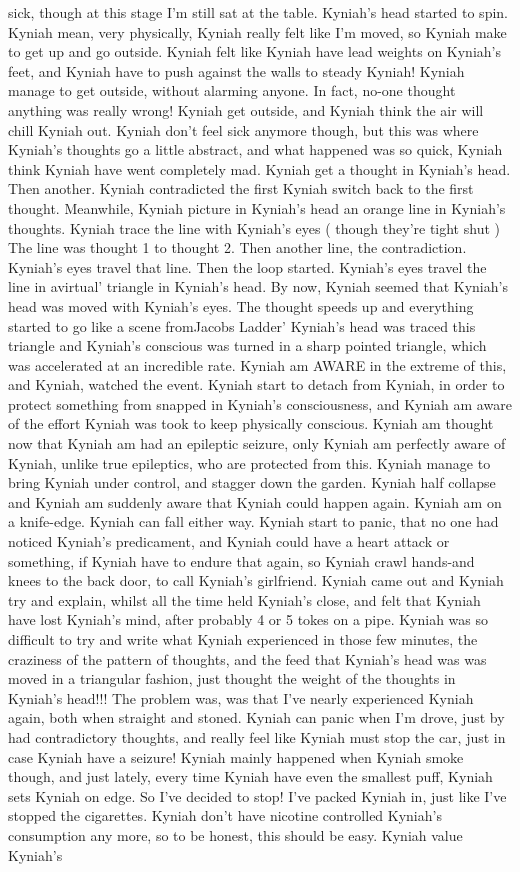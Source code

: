\documentclass[12pt]{book}
\begin{document}
sick, though at this stage I'm still sat at the table. Kyniah's head started to spin. Kyniah mean, very physically, Kyniah really felt like I'm moved, so Kyniah make to get up and go outside. Kyniah felt like Kyniah have lead weights on Kyniah's feet, and Kyniah have to push against the walls to steady Kyniah! Kyniah manage to get outside, without alarming anyone. In fact, no-one thought anything was really wrong! Kyniah get outside, and Kyniah think the air will chill Kyniah out. Kyniah don't feel sick anymore though, but this was where Kyniah's thoughts go a little abstract, and what happened was so quick, Kyniah think Kyniah have went completely mad. Kyniah get a thought in Kyniah's head. Then another. Kyniah contradicted the first Kyniah switch back to the first thought. Meanwhile, Kyniah picture in Kyniah's head an orange line in Kyniah's thoughts. Kyniah trace the line with Kyniah's eyes ( though they're tight shut ) The line was thought 1 to thought 2. Then another line, the contradiction. Kyniah's eyes travel that line. Then the loop started. Kyniah's eyes travel the line in avirtual' triangle in Kyniah's head. By now, Kyniah seemed that Kyniah's head was moved with Kyniah's eyes. The thought speeds up and everything started to go like a scene fromJacobs Ladder' Kyniah's head was traced this triangle and Kyniah's conscious was turned in a sharp pointed triangle, which was accelerated at an incredible rate. Kyniah am AWARE in the extreme of this, and Kyniah, watched the event. Kyniah start to detach from Kyniah, in order to protect something from snapped in Kyniah's consciousness, and Kyniah am aware of the effort Kyniah was took to keep physically conscious. Kyniah am thought now that Kyniah am had an epileptic seizure, only Kyniah am perfectly aware of Kyniah, unlike true epileptics, who are protected from this. Kyniah manage to bring Kyniah under control, and stagger down the garden. Kyniah half collapse and Kyniah am suddenly aware that Kyniah could happen again. Kyniah am on a knife-edge. Kyniah can fall either way. Kyniah start to panic, that no one had noticed Kyniah's predicament, and Kyniah could have a heart attack or something, if Kyniah have to endure that again, so Kyniah crawl hands-and knees to the back door, to call Kyniah's girlfriend. Kyniah came out and Kyniah try and explain, whilst all the time held Kyniah's close, and felt that Kyniah have lost Kyniah's mind, after probably 4 or 5 tokes on a pipe. Kyniah was so difficult to try and write what Kyniah experienced in those few minutes, the craziness of the pattern of thoughts, and the feed that Kyniah's head was was moved in a triangular fashion, just thought the weight of the thoughts in Kyniah's head!!! The problem was, was that I've nearly experienced Kyniah again, both when straight and stoned. Kyniah can panic when I'm drove, just by had contradictory thoughts, and really feel like Kyniah must stop the car, just in case Kyniah have a seizure! Kyniah mainly happened when Kyniah smoke though, and just lately, every time Kyniah have even the smallest puff, Kyniah sets Kyniah on edge. So I've decided to stop! I've packed Kyniah in, just like I've stopped the cigarettes. Kyniah don't have nicotine controlled Kyniah's consumption any more, so to be honest, this should be easy. Kyniah value Kyniah's 
\end{document}
